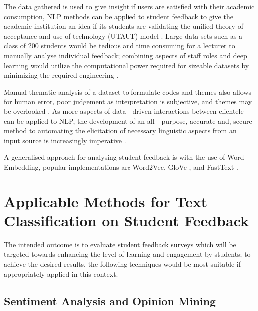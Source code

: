 The data gathered is used to give insight if users are satisfied with their academic consumption, NLP methods can be applied to student feedback to give the academic institution an idea if its students are validating the unified theory of acceptance and use of technology (UTAUT) model \parencite{kayali2020adoption}. Large data sets such as a class of 200 students would be tedious and time consuming for a lecturer to manually analyse individual feedback; combining aspects of staff roles and deep learning would utilize the computational power required for sizeable datasets by minimizing the required engineering \parencite{lecun2015deep}.

Manual thematic analysis of a dataset to formulate codes and themes also allows for human error, poor judgement as interpretation is subjective, and themes may be overlooked \parencite{belotto2018data}. As more aspects of data---driven interactions between clientele can be applied to NLP, the development of an all---purpose, accurate and, secure method to automating the elicitation of necessary linguistic aspects from an input source is increasingly imperative \parencite{sindhu2019aspect}.

A generalised approach for analysing student feedback is with the use of Word Embedding, popular implementations are Word2Vec, GloVe \parencite{pennington2014glove}, and FastText \parencite{edalati2020potential}.

\section[Applicable Methods for Text Classification on Student Feedback]{\texorpdfstring{Applicable Methods for Text \\ Classification on Student Feedback}{Applicable Methods for Text Classification on Student Feedback}}

The intended outcome is to evaluate student feedback surveys which will be targeted towards enhancing the level of learning and engagement by students; to achieve the desired results, the following techniques would be most suitable if appropriately applied in this context.

\subsection{Sentiment Analysis and Opinion Mining}

